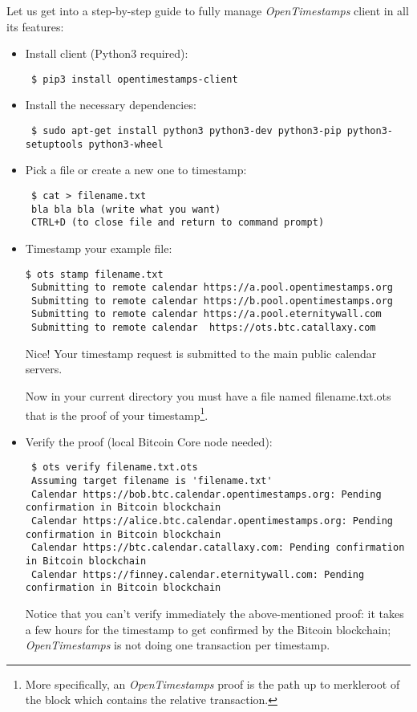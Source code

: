 \bigskip
\noindent
Let us get into a step-by-step guide to fully manage \textit{OpenTimestamps} client in all its features:
\begin{itemize}
\item Install client (Python3 required):\bigskip
\begin{lstlisting}
 $ pip3 install opentimestamps-client
\end{lstlisting}
\item Install the necessary dependencies:\bigskip
\begin{lstlisting}
 $ sudo apt-get install python3 python3-dev python3-pip python3-setuptools python3-wheel
\end{lstlisting}
\item Pick a file or create a new one to timestamp:\bigskip
\begin{lstlisting}
 $ cat > filename.txt
 bla bla bla (write what you want)
 CTRL+D (to close file and return to command prompt)
\end{lstlisting}
\item Timestamp your example file:\bigskip
\begin{lstlisting}[breakatwhitespace=true]
 $ ots stamp filename.txt 
 Submitting to remote calendar https://a.pool.opentimestamps.org
 Submitting to remote calendar https://b.pool.opentimestamps.org
 Submitting to remote calendar https://a.pool.eternitywall.com
 Submitting to remote calendar  https://ots.btc.catallaxy.com
\end{lstlisting}
Nice! Your timestamp request is submitted to the main public calendar servers.

\bigskip
\noindent
Now in your current directory you must have a file named \colorbox{Grey!10}{filename.txt.ots} that is the proof of your timestamp\footnote{More specifically, an \textit{OpenTimestamps} proof is the path up to merkleroot of the block which contains the relative transaction.}.
\item Verify the proof (local Bitcoin Core node needed):\bigskip
\begin{lstlisting}
 $ ots verify filename.txt.ots 
 Assuming target filename is 'filename.txt'
 Calendar https://bob.btc.calendar.opentimestamps.org: Pending confirmation in Bitcoin blockchain
 Calendar https://alice.btc.calendar.opentimestamps.org: Pending confirmation in Bitcoin blockchain
 Calendar https://btc.calendar.catallaxy.com: Pending confirmation in Bitcoin blockchain
 Calendar https://finney.calendar.eternitywall.com: Pending confirmation in Bitcoin blockchain
\end{lstlisting}
Notice that you can't verify immediately the above-mentioned proof: it takes a few hours for the timestamp to get confirmed by the Bitcoin blockchain; \textit{OpenTimestamps} is not doing one transaction per timestamp.


\end{itemize}
